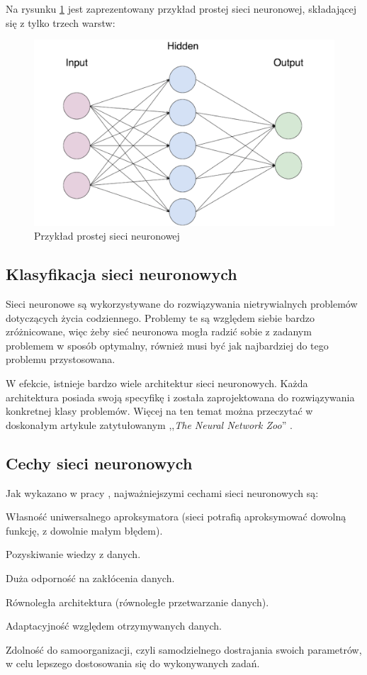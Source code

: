 Na rysunku \ref{SimpleNetworkExample} jest zaprezentowany przykład prostej sieci neuronowej, składającej się z tylko trzech warstw:
\vspace{0.3cm}
\begin{figure}[H]
\centering
\includegraphics[width=14cm]{resources/figures/network_example.png}
\caption{Przykład prostej sieci neuronowej}
\label{SimpleNetworkExample}
\end{figure}

\subsection{Klasyfikacja sieci neuronowych}
Sieci neuronowe są wykorzystywane do rozwiązywania nietrywialnych problemów dotyczących życia codziennego. Problemy te są względem siebie bardzo zróżnicowane, więc żeby sieć neuronowa mogła radzić sobie z zadanym problemem w sposób optymalny, również musi być jak najbardziej do tego problemu przystosowana.

W efekcie, istnieje bardzo wiele architektur sieci neuronowych. Każda architektura posiada swoją specyfikę i została zaprojektowana do rozwiązywania konkretnej klasy problemów. Więcej na ten temat można przeczytać w doskonałym artykule zatytułowanym ,,\textit{The Neural Network Zoo}'' \cite{neuralNetworkZoo}.

\subsection{Cechy sieci neuronowych}
Jak wykazano w pracy \cite{dudek:wyklad:sieciAproksymacja}, najważniejszymi cechami sieci neuronowych są:
\begin{enumerate*}
\item Własność uniwersalnego aproksymatora (sieci potrafią aproksymować dowolną funkcję, z dowolnie małym błędem).
\item Pozyskiwanie wiedzy z danych.
\item Duża odporność na zakłócenia danych.
\item Równoległa architektura (równoległe przetwarzanie danych).
\item Adaptacyjność względem otrzymywanych danych.
\item Zdolność do samoorganizacji, czyli samodzielnego dostrajania swoich
parametrów, w celu lepszego dostosowania się do wykonywanych zadań.
\end{enumerate*}

